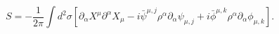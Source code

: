\begin{equation}
S= -\frac{1}{2\pi}\int d^2\sigma\left [ \partial_{\alpha}X^{\mu}\partial^{\alpha}X_{\mu}
-i \bar{\psi}^{\mu,j}\rho^{\alpha}\partial_{\alpha}  \psi_{\mu,j}
+ i \bar{\phi}^{\mu,k}\rho^{\alpha}\partial_{\alpha}  \phi_{\mu,k}\right ].\label{a}
\end{equation}

